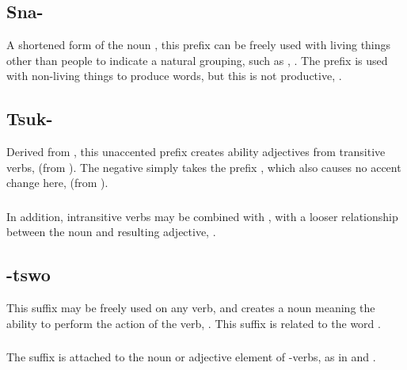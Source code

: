 \subsection{Sna-} A shortened form of the noun  , this prefix can be freely used with living
things other than people to indicate a natural grouping, such as
 ,  .  The prefix is used with non-living things to produce words,
but this is not productive,  .

\subsection{Tsuk-} Derived from , this unaccented prefix
creates ability adjectives from transitive verbs, 
 (from  ).  The negative simply takes the
prefix , which also causes no accent change here,
  (from  ).

\subsubsection{} In addition, intransitive verbs may
be combined with , with a looser relationship between the
noun and resulting adjective, 
  .

\subsection{-tswo} This suffix may be freely used on any verb, and
creates a noun meaning the ability to perform the action of the verb,
   .
This suffix is related to the word  .

\subsubsection{} The suffix  is attached to the noun or
adjective element of -verbs, as in   and  .

